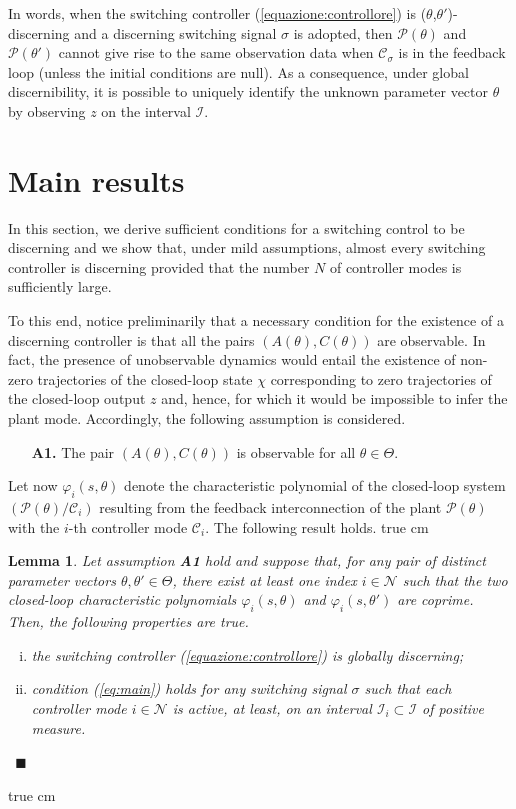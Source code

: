 \documentclass[letterpaper, 10 pt, conference]{ieeetran}
\def\qedp{\hspace*{\fill}~{\tiny $\blacksquare$}}
\def\salt{\vskip 0.2 true cm}
\newtheorem{itlemma}{Lemma}
\newenvironment{lemma}{\begin{itlemma}\rm}{\end{itlemma}}
\begin{document}
In words, when the switching controller (\ref{equazione:controllore}) is ($\theta$,$\theta'$)-discerning and
a discerning switching signal $\sigma$ is adopted, 
then  $\mathcal P(\theta)$ and $\mathcal P(\theta')$
cannot give rise to the same observation data 
when $\mathcal C_\sigma$ is in the feedback loop (unless the initial conditions are null). As a consequence, under global discernibility, 
it is possible to uniquely identify the unknown parameter vector $\theta$ by observing $z$ on the interval $\mathcal I$.



\section{Main results}\label{main}


In this section, we derive sufficient conditions for a switching control to be discerning and we show that, under mild assumptions, almost every switching controller
is discerning provided that the number $N$ of controller modes is sufficiently large.

To this end, notice preliminarily that a necessary condition for the existence of a discerning controller is that all the pairs $(A(\theta),C(\theta))$
are observable. In fact, the presence of unobservable dynamics would entail the existence
of non-zero trajectories of the closed-loop state $\chi$ corresponding to zero trajectories of the closed-loop output  $z$ and, hence, for which
it would be impossible to infer the plant mode. 
Accordingly, the following assumption is considered. 

\begin{enumerate}
\item[\bf A1.] The pair $(A(\theta),C(\theta))$ is observable for all $\theta \in \Theta$.
\end{enumerate} 

Let now $\varphi_i(s,\theta)$ denote the characteristic polynomial of the closed-loop system $(\mathcal P(\theta) / \mathcal C_i)$ resulting from the
feedback interconnection of the plant $\mathcal P(\theta)$ with the $i$-th controller mode $\mathcal C_i$. The following result holds. \salt

\begin{lemma} \label{lem:poly} Let assumption \textbf{A1} hold and suppose that, for any pair of distinct parameter vectors $\theta, \theta' \in \Theta$, there exist at least one index $i \in \mathcal N$ 
such that the two closed-loop characteristic polynomials $\varphi_i(s,\theta)$ and $\varphi_i(s,\theta')$ are coprime. Then, the following properties are true.
\begin{enumerate}[(i)]
\item the switching controller  (\ref{equazione:controllore})  is globally discerning;
\item condition (\ref{eq:main}) holds for any switching signal $\sigma$ such that each controller mode $i \in \mathcal N$ is active, at least, on an interval $\mathcal I_i \subset \mathcal I$
of positive measure.
\end{enumerate}
\qedp
\end{lemma} \salt
\end{document}
